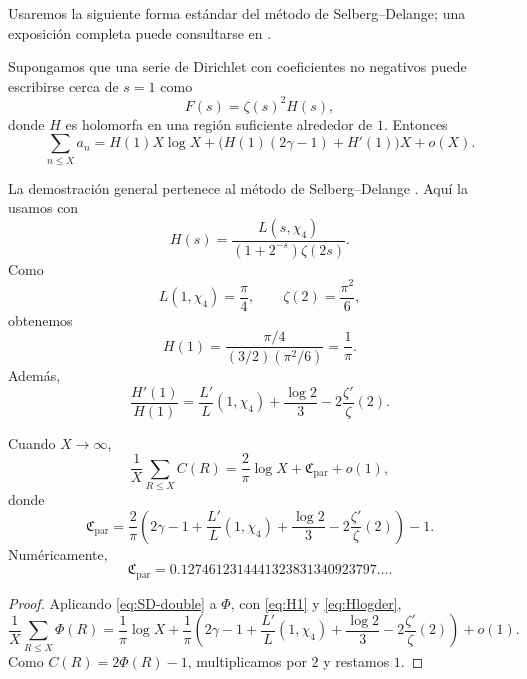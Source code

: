 \documentclass[11pt,a4paper,openany]{report}
\begin{document}
Usaremos la siguiente forma estándar del método de Selberg--Delange; una exposición completa puede consultarse en \cite{Tenenbaum}.

\begin{theorem}
Supongamos que una serie de Dirichlet con coeficientes no negativos puede escribirse cerca de \(s=1\) como
\[
 F(s)=\zeta(s)^2H(s),
\]
donde \(H\) es holomorfa en una región suficiente alrededor de \(1\). Entonces
\begin{equation}
 \sum_{n\le X}a_n
 =H(1)X\log X+\bigl(H(1)(2\gamma-1)+H'(1)\bigr)X+o(X).
 \label{eq:SD-double}
\end{equation}
\end{theorem}

La demostración general pertenece al método de Selberg--Delange \cite{Tenenbaum}. Aquí la usamos con
\[
 H(s)=\frac{L(s,\chi_4)}{(1+2^{-s})\zeta(2s)}.
\]
Como
\[
 L(1,\chi_4)=\frac\pi4,
 \qquad
 \zeta(2)=\frac{\pi^2}{6},
\]
obtenemos
\begin{equation}
 H(1)=\frac{\pi/4}{(3/2)(\pi^2/6)}=\frac1\pi.
 \label{eq:H1}
\end{equation}
Además,
\begin{equation}
 \frac{H'(1)}{H(1)}
 =\frac{L'}{L}(1,\chi_4)
 +\frac{\log2}{3}
 -2\frac{\zeta'}{\zeta}(2).
 \label{eq:Hlogder}
\end{equation}

\begin{theorem}
Cuando \(X\to\infty\),
\begin{equation}
 \boxed{
 \frac1X\sum_{R\le X}C(R)
 =\frac{2}{\pi}\log X+\mathfrak C_{\mathrm{par}}+o(1),}
 \label{eq:mean-complexity}
\end{equation}
donde
\begin{equation}
 \boxed{
 \mathfrak C_{\mathrm{par}}
 =\frac{2}{\pi}\left(
 2\gamma-1+\frac{L'}{L}(1,\chi_4)
 +\frac{\log2}{3}-2\frac{\zeta'}{\zeta}(2)
 \right)-1.}
 \label{eq:Cpar-exact}
\end{equation}
Numéricamente,
\begin{equation}
 \boxed{\mathfrak C_{\mathrm{par}}
 =0.1274612314441323831340923797\ldots.}
 \label{eq:Cpar-value}
\end{equation}
\end{theorem}

\begin{proof}
Aplicando \eqref{eq:SD-double} a \(\Phi\), con \eqref{eq:H1} y \eqref{eq:Hlogder},
\[
 \frac1X\sum_{R\le X}\Phi(R)
 =\frac1\pi\log X
 +\frac1\pi\left(
 2\gamma-1+\frac{L'}{L}(1,\chi_4)
 +\frac{\log2}{3}-2\frac{\zeta'}{\zeta}(2)
 \right)+o(1).
\]
Como \(C(R)=2\Phi(R)-1\), multiplicamos por \(2\) y restamos \(1\).
\end{proof}
\end{document}
